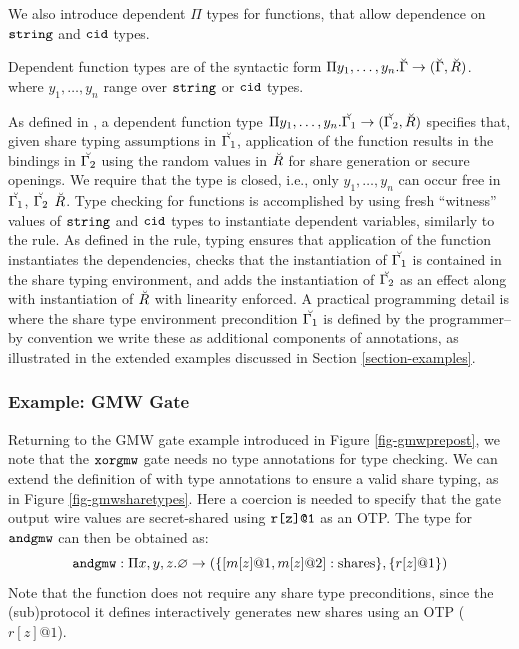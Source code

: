 \noindent We also introduce dependent $\Pi$ types for functions, that allow
dependence on $\texttt{string}$ and $\texttt{cid}$ types.
\begin{definition}
  Dependent function types are of the syntactic form
  $\Pi y_1,\ldots,y_n. \breve{\Gamma} \rightarrow (\breve{\Gamma}, \breve{R})$.
  where $y_1,\ldots,y_n$ range over $\texttt{string}$ or $\texttt{cid}$ types.
\end{definition}
As defined in , a dependent function type $\Pi
y_1,\ldots,y_n. \breve{\Gamma_1} \rightarrow (\breve{\Gamma_2},
\breve{R})$ specifies that, given share typing assumptions in
$\breve{\Gamma_1}$, application of the function results in the bindings
in $\breve{\Gamma_2}$ using the random values in $\breve{R}$ for share
generation or secure openings.  We require that the type is closed,
i.e., only $y_1,\ldots,y_n$ can occur free in $\breve{\Gamma_1}$,
$\breve{\Gamma_2}$ $\breve{R}$.  Type checking for functions is
accomplished by using fresh ``witness'' values of $\texttt{string}$ and
$\texttt{cid}$ types to instantiate dependent variables, similarly to the
 rule. As defined in the  rule,
typing ensures that application of the function instantiates the
dependencies, checks that the instantiation of $\breve{\Gamma_1}$ is
contained in the share typing environment, and adds the instantiation
of $\breve{\Gamma_2}$ as an effect along with instantiation of
$\breve{R}$ with linearity enforced. A practical programming detail is
where the share type environment precondition $\breve{\Gamma_1}$ is
defined by the programmer-- by convention we write these as
additional components of  annotations, as
illustrated in the extended examples discussed in Section
\ref{section-examples}.

\subsubsection{Example: GMW  Gate}

Returning to the GMW  gate example introduced in Figure \ref{fig-gmwprepost},
we note that the $\texttt{xorgmw}$ gate needs no type annotations for type checking.
We can extend the definition of  with type annotations to ensure a
valid share typing, as in Figure \ref{fig-gmwsharetypes}. Here a coercion
is needed to specify that the gate output wire values are secret-shared using
$\texttt{r[z]@1}$ as an OTP. The type for $\texttt{andgmw}$ can then be
obtained as:
$$
\texttt{andgmw} : \Pi x,y,z . \varnothing \rightarrow (\{ [m[z]@1,m[z]@2] : \mathrm{shares} \}, \{ r[z]@1 \})  
$$
Note that the function does not require any share type preconditions, since
the (sub)protocol it defines interactively generates new shares using an OTP
($r[z]@1$).

